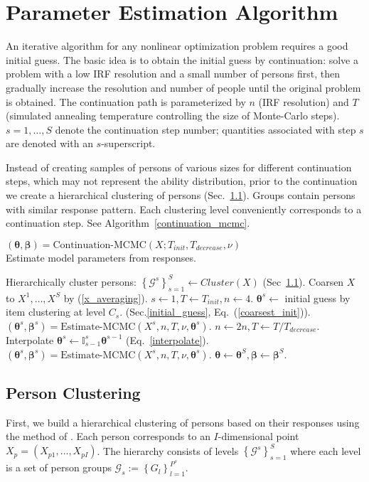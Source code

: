 \documentclass{article}
\newcommand{\bbeta}{\boldsymbol\beta}
\newcommand{\bta}{\boldsymbol\ta}
\newcommand{\cG}{\mathcal{G}}
\newcommand{\ta}{\theta}
\newcommand{\lla}{\longleftarrow}
\newcommand{\I}{\mathbb{I}}
\begin{document}
\section{Parameter Estimation Algorithm}
An iterative algorithm for any nonlinear optimization problem requires a good initial guess. The basic idea is to obtain the initial guess by continuation: solve a problem with a low IRF resolution and a small number of persons first, then gradually increase the resolution and number of people until the original problem is obtained. The continuation path is parameterized by $n$ (IRF resolution) and $T$ (simulated annealing temperature controlling the size of Monte-Carlo steps). $s=1,\dots,S$ denote the continuation step number; quantities associated with step $s$ are denoted with an $s$-superscript.

Instead of creating samples of persons of various sizes for different continuation steps, which may not represent the ability distribution, prior to the continuation we create a hierarchical clustering of persons (Sec.~\ref{miniclustering}). Groups contain persons with similar response pattern. Each clustering level conveniently corresponds to a continuation step. See Algorithm~\ref{continuation_mcmc}.

\begin{algorithm}
	\caption[]{$(\bta, \bbeta) = {\mbox{Continuation-MCMC}}(X; T_{init}, T_{decrease}, \nu)$\\\hspace{\textwidth}Estimate model parameters from responses.}
	\begin{algorithmic}
	\label{continuation_mcmc}
    \STATE Hierarchically cluster persons: $\left\{\cG^s\right\}_{s=1}^S \lla Cluster(X)$ (Sec~\ref{miniclustering}).
    \STATE Coarsen $X$ to $X^1,\dots,X^S$ by (\ref{x_averaging}).
    \STATE $s \lla 1, T \lla T_{init}, n \lla 4$.
    \STATE $\bta^s \lla$ initial guess by item clustering at level $C_s$. (Sec.\ref{initial_guess}, Eq.~(\ref{coarsest_init})).
    \STATE $(\bta^s, \bbeta^s) = {\mbox{Estimate-MCMC}}(X^s, n, T, \nu, \bta^s)$.
    	\STATE $n \lla 2 n, T \lla T / T_{decrease}$.
    	\STATE Interpolate $\bta^s \lla \I_{s-1}^s \bta^{s-1}$ (Eq.~\ref{interpolate}). 
	    \STATE $(\bta^s, \bbeta^s) = {\mbox{Estimate-MCMC}}(X^s, n, T, \nu, \bta^s)$.
   	\ENDFOR
   	\STATE $\bta \lla \bta^S, \bbeta \lla \bbeta^S$.
	\end{algorithmic}
\end{algorithm}

\subsection{Person Clustering}
\label{miniclustering}
First, we build a hierarchical clustering of persons based on their responses using the method of \cite{miniclustering}. Each person corresponds to an $I$-dimensional point $X_p = (X_{p1},\dots,X_{pI})$. The hierarchy consists of levels $\left\{\cG^s\right\}_{s=1}^S$ where each level is a set of person groups $\cG_s := \left\{G_l\right\}_{l=1}^{P^s}$.
\end{document}
